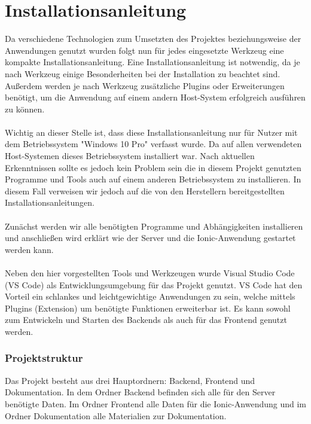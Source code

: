 \chapter{Installationsanleitung}
Da verschiedene Technologien zum Umsetzten des Projektes beziehungsweise der Anwendungen genutzt wurden folgt nun für jedes eingesetzte Werkzeug eine kompakte Installationsanleitung. Eine Installationsanleitung ist notwendig, da je nach Werkzeug einige Besonderheiten bei der Installation zu beachtet sind. Außerdem werden je nach Werkzeug zusätzliche Plugins oder Erweiterungen benötigt, um die Anwendung auf einem andern Host-System erfolgreich ausführen zu können.
\\\\
Wichtig an dieser Stelle ist, dass diese Installationsanleitung nur für Nutzer mit dem Betriebssystem "Windows 10 Pro"{} verfasst wurde. Da auf allen verwendeten Host-Systemen dieses Betriebssystem installiert war. Nach aktuellen Erkenntnissen sollte es jedoch kein Problem sein die in diesem Projekt genutzten Programme und Tools auch auf einem anderen Betriebssystem zu installieren. In diesem Fall verweisen wir jedoch auf die von den Herstellern bereitgestellten Installationsanleitungen.
\\\\
Zunächst werden wir alle benötigten Programme und Abhängigkeiten installieren und anschließen wird erklärt wie der Server und die Ionic-Anwendung gestartet werden kann.
\\\\
Neben den hier vorgestellten Tools und Werkzeugen wurde Visual Studio Code (VS Code) als Entwicklungsumgebung für das Projekt genutzt. VS Code hat den Vorteil ein schlankes und leichtgewichtige Anwendungen zu sein, welche mittels Plugins (Extension) um benötigte Funktionen erweiterbar ist. Es kann sowohl zum Entwickeln und Starten des Backends als auch für das Frontend genutzt werden.

\subsection{Projektstruktur}\label{Projektstruktur}
Das Projekt besteht aus drei Hauptordnern: Backend, Frontend und Dokumentation. In dem Ordner Backend befinden sich alle für den Server benötigte Daten. Im Ordner Frontend alle Daten für die Ionic-Anwendung und im Ordner Dokumentation alle Materialien zur Dokumentation.




